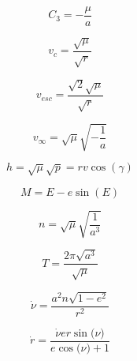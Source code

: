 \documentclass[10pt]{article}
\begin{document}
\par\smallskip
\noindent\begin{minipage}[t]{0.2487\textwidth}
\[C_{3} = - \frac{\mu}{a}\]
\end{minipage}%
\begin{minipage}[t]{0.2487\textwidth}
\[v_{c} = \frac{\sqrt{\mu}}{\sqrt{r}}\]
\end{minipage}%
\begin{minipage}[t]{0.2487\textwidth}
\[v_{esc} = \frac{\sqrt{2} \sqrt{\mu}}{\sqrt{r}}\]
\end{minipage}%
\begin{minipage}[t]{0.2487\textwidth}
\[v_{\infty} = \sqrt{\mu} \sqrt{- \frac{1}{a}}\]
\end{minipage}
\par\smallskip
\noindent\begin{minipage}[t]{0.2487\textwidth}
\[h = \sqrt{\mu} \sqrt{p} = r v \cos{\left(\gamma \right)}\]
\end{minipage}%
\begin{minipage}[t]{0.2487\textwidth}
\[M = E - e \sin{\left(E \right)}\]
\end{minipage}%
\begin{minipage}[t]{0.2487\textwidth}
\[n = \sqrt{\mu} \sqrt{\frac{1}{a^{3}}}\]
\end{minipage}%
\begin{minipage}[t]{0.2487\textwidth}
\[T = \frac{2 \pi \sqrt{a^{3}}}{\sqrt{\mu}}\]
\end{minipage}
\par\smallskip
\noindent\begin{minipage}[t]{0.2487\textwidth}
\[\dot{\nu} = \frac{a^{2} n \sqrt{1 - e^{2}}}{r^{2}}\]
\end{minipage}%
\begin{minipage}[t]{0.2487\textwidth}
\[\dot{r} = \frac{\dot{\nu} e r \sin\bigl(\nu \bigr)}{e \cos\bigl(\nu \bigr) + 1}\]
\end{minipage}%
\end{document}
